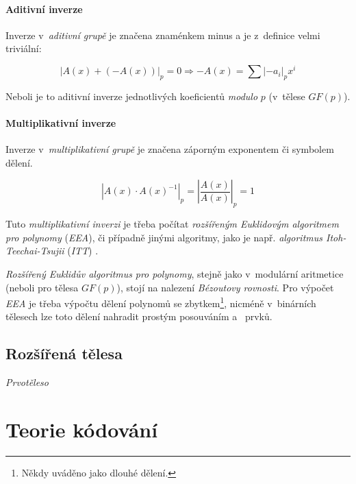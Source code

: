 \documentclass[thesis=M,czech,hidelinks]{FITthesis}[2012/06/26]
\newcommand{\0}{{\textcolor[gray]{0.80}{0}}}
\begin{document}
\subsubsection{Aditivní inverze}

Inverze v~\emph{aditivní grupě} je značena znaménkem minus \uv{$-$} a je
z~definice velmi triviální:

$$
    \left| A(x) + (-A(x)) \right|_p = 0 \Rightarrow -A(x) =
    \sum \left|-a_i\right|_p x^i
$$

Neboli je to aditivní inverze jednotlivých koeficientů \emph{modulo} $p$
(v~tělese $GF(p)$).


\subsubsection{Multiplikativní inverze}

Inverze v~\emph{multiplikativní grupě} je značena záporným exponentem
 či symbolem dělení.

$$
    \left| A(x) \cdot A(x)^{-1} \right|_p = \left| \frac{A(x)}{A(x)} \right|_p = 1
$$

Tuto \emph{multiplikativní inverzi} je třeba počítat \emph{rozšířeným Euklidovým
algoritmem pro polynomy} (\emph{EEA}), či případně jinými algoritmy, jako je
např. \emph{algoritmus Itoh-Teechai-Tsujii} (\emph{ITT}) \cite{FIT_BHW,ITT}.

\emph{Rozšířený Euklidův algoritmus} \emph{pro polynomy}, stejně jako
v~modulární aritmetice (neboli pro tělesa $GF(p)$), stojí na nalezení
\emph{Bézoutovy rovnosti}. Pro výpočet \emph{EEA} je třeba výpočtu dělení
polynomů se zbytkem\footnote{
    Někdy uváděno jako dlouhé dělení.
}, nicméně v~binárních tělesech lze toto dělení nahradit prostým posouváním
a~ prvků.


\section{Rozšířená tělesa}

\emph{Prvotěleso}





\chapter{Teorie kódování}\label{kap_kody}
\end{document}
